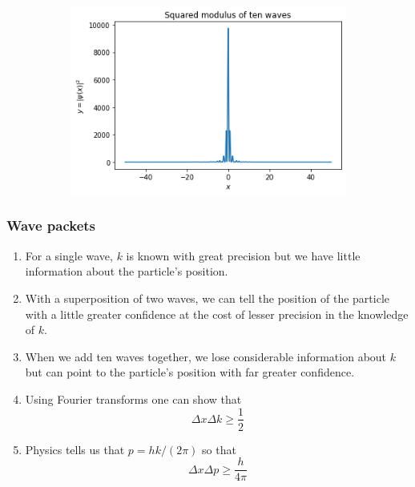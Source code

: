 \documentclass{beamer}
\begin{document}
\begin{frame}
\begin{figure}
\begin{subfigure}{0.4\textwidth}
\end{subfigure}
\hfill
\begin{subfigure}{0.4\textwidth}
\includegraphics[scale=0.3]{ten-waves-sq}
\end{subfigure}
\end{figure}
\end{frame}

\begin{frame}
\frametitle{Wave packets}
\begin{enumerate}
\item For a single wave, $k$ is known with great precision but we have little
information about the particle's position.
\item With a superposition of two waves, we can tell the position of the 
particle with a little greater confidence at the cost of lesser precision in
the knowledge of $k$.
\item When we add ten waves together, we lose considerable information about $k$
but can point to the particle's position with far greater confidence.
\item Using Fourier transforms one can show that 
\begin{equation}\label{e9}
\Delta x \Delta k \ge \frac{1}{2}
\end{equation}
\item Physics tells us that $p = hk/(2\pi)$ so that 
\begin{equation}\label{e10}
\Delta x \Delta p \ge \frac{h}{4\pi}
\end{equation}
\end{enumerate}
\end{frame}
\end{document}
